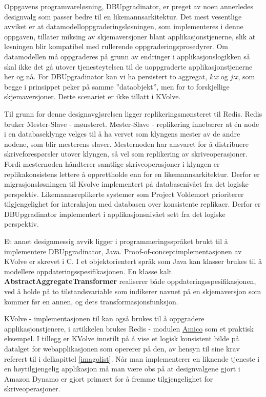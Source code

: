 Oppgavens programvareløsning, DBUpgradinator, er preget av noen annerledes designvalg som passer bedre til en likemannsarkitektur. Det mest vesentlige avviket er at datamodelloppgraderingsløsningen, som implementeres i denne oppgaven, tillater miksing av skjemaversjoner blant applikasjonstjenerne, slik at løsningen blir kompatibel med rullerende oppgraderingsprosedyrer. Om datamodellen må oppgraderes på grunn av endringer i applikasjonslogikken så skal ikke det gå utover tjenesteytelsen til de uoppgraderte applikasjonstjenerne her og nå. For DBUpgradinator kan vi ha persistert to aggregat, \emph{k:x} og \emph{j:x}, som begge i prinsippet peker på samme ''dataobjekt'', men for to forskjellige skjemaversjoner. Dette scenariet er ikke tillatt i KVolve.

Til grunn for denne designavgjørelsen ligger replikeringsmønsteret til Redis. Redis bruker Mester-Slave - mønsteret. Mester-Slave - replikering innebærer at én node i en databaseklynge velges til å ha vervet som klyngens mester av de andre nodene, som blir mesterens slaver. Mesternoden har ansvaret for å distribuere skriveforespørsler utover klyngen, så vel som replikering av skriveoperasjoner. Fordi mesternoden håndterer samtlige skriveoperasjoner i klyngen er replikakonsistens lettere å opprettholde enn for en likemannsarkitektur. Derfor er migrasjonsløsningen til Kvolve implementert på databasenivået fra det logiske perspektiv. Likemannsreplikerte systemer som Project Voldemort prioriterer tilgjengelighet for interaksjon med databasen over konsistente replikaer. Derfor er DBUpgradinator implementert i applikasjonsnivået sett fra det logiske perspektiv.

Et annet designmessig avvik ligger i programmeringsspråket brukt til å implementere DBUpgradinator, Java. Proof-of-concept\-implementasjonen av KVolve er skrevet i C. I et objektorientert språk som Java kan klasser brukes til å modellere oppdateringsspesifikasjonen. En klasse kalt \textbf{AbstractAggregateTransformer} realiserer både oppdateringsspesifikasjonen, ved å holde på to tilstandsvariable som indikerer navnet på en skjemaversjon som kommer før en annen, og dets transformasjonsfunksjon.

KVolve - implementasjonen til \cite{saur2016} kan også brukes til å oppgradere applikasjonstjenere, i artikkelen brukes Redis - modulen \underline{Amico} som et praktisk eksempel. I tillegg er KVolve innstilt på å vise et logisk konsistent bilde på datalget for webapplikasjonen som opererer på den, av hensyn til \cite{dumitras2009nodowntime} sine krav referert til i delkapittel \ref{imagolist}. Når man implementerer en liknende tjeneste i en høytilgjengelig applikasjon må man være obs på at designvalgene gjort i Amazon Dynamo er gjort primært for å fremme tilgjengelighet for skriveoperasjoner.